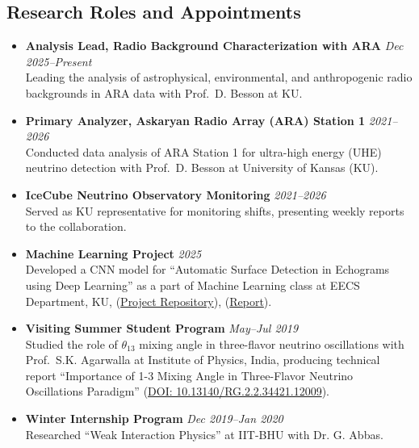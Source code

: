 \documentclass[10pt]{report}
\begin{document}
\subsection*{Research Roles and Appointments}
\begin{itemize}

    \item \textbf{Analysis Lead, Radio Background Characterization with ARA}  \textit{Dec 2025--Present} \\
    Leading the analysis of astrophysical, environmental, and anthropogenic radio backgrounds in ARA data with Prof.\  D. Besson at KU.

    \item \textbf{Primary Analyzer, Askaryan Radio Array (ARA) Station 1}  \textit{2021--2026} \\
    Conducted data analysis of ARA Station 1 for ultra-high energy (UHE) neutrino detection with Prof.\ D. Besson at University of Kansas (KU).

    \item \textbf{IceCube Neutrino Observatory Monitoring}  \textit{2021--2026} \\
    Served as KU representative for monitoring shifts, presenting weekly reports to the collaboration.

    \item \textbf{Machine Learning Project}  \textit{2025} \\
    Developed a CNN model for ``Automatic Surface Detection in Echograms using Deep Learning'' as a part of Machine Learning class at EECS Department, KU, (\href{https://github.com/Mohammad-Neutrino/Machine_Learning_Project}{Project Repository}), (\href{https://github.com/Mohammad-Neutrino/Machine_Learning_Project/blob/trunk/Project/report/final_report.pdf}{Report}).

    \item \textbf{Visiting Summer Student Program}  \textit{May--Jul 2019} \\
    Studied the role of $\theta_{13}$ mixing angle in three-flavor neutrino oscillations with Prof.\ S.K. Agarwalla at Institute of Physics, India, producing technical report ``Importance of 1-3 Mixing Angle in Three-Flavor Neutrino Oscillations Paradigm'' (\href{https://www.researchgate.net/publication/340095776_Importance_of_1-3_Mixing_Angle_in_Three-Flavor_Neutrino_Oscillations_Paradigm_SSVP_Summer_Project_Report}{DOI: 10.13140/RG.2.2.34421.12009}).

    \item \textbf{Winter Internship Program}  \textit{Dec 2019--Jan 2020} \\
    Researched ``Weak Interaction Physics'' at IIT-BHU with Dr. G. Abbas.
    
\end{itemize} 
\end{document}
